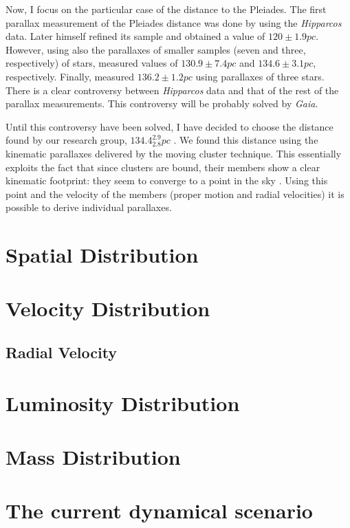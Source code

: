 Now, I focus on the particular case of the distance to the Pleiades. The first parallax measurement of the Pleiades distance was done by \citet{1999A&A...341L..71V} using the \emph{Hipparcos} data. Later himself \citep{2009A&A...497..209V} refined its sample and obtained a value of $120\pm1.9pc$. However, \citet{2000ApJ...533..938G, 2005AJ....129.1616S} using also the parallaxes of smaller samples (seven and three, respectively) of stars, measured values of $130.9\pm7.4pc$ and $134.6\pm3.1pc$, respectively. Finally, \citet{2014Sci...345.1029M} measured $136.2\pm1.2pc$ using parallaxes of three stars. There is a clear controversy between \emph{Hipparcos} data and that of the rest of the parallax measurements. This controversy will be probably solved by \emph{Gaia}. 

Until this controversy have been solved, I have decided to choose the distance found by our research group, $134.4^{2.9}_{2.8}pc$ \citep{Galli2017}. We found this distance using the kinematic parallaxes delivered by the moving cluster technique. This essentially exploits the fact that since clusters are bound, their members show a clear kinematic footprint: they seem to converge to a point in the sky \citep{1964IAUS...20...50B}. Using this point and the velocity of the members (proper motion and radial velocities) it is possible to derive individual parallaxes.


\section{Spatial Distribution}

\section{Velocity Distribution}
\subsection{Radial Velocity}

\section{Luminosity Distribution}

\section{Mass Distribution}

\section{The current dynamical scenario}

